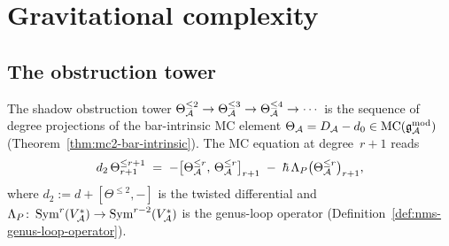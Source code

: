 %

\section{Gravitational complexity}
\label{sec:thqg-gravitational-complexity}


\subsection{The obstruction tower}
\label{subsec:thqg-obstruction-tower}

The shadow obstruction tower
$\Theta_{\mathcal{A}}^{\leq 2} \to \Theta_{\mathcal{A}}^{\leq 3} \to
\Theta_{\mathcal{A}}^{\leq 4} \to \cdots$
is the sequence of degree projections of the bar-intrinsic MC element
$\Theta_{\mathcal{A}} = D_{\mathcal{A}} - d_0 \in \mathrm{MC}(\mathfrak{g}_{\mathcal{A}}^{\mathrm{mod}})$
(Theorem~\ref{thm:mc2-bar-intrinsic}). The MC equation at
degree~$r{+}1$ reads
\begin{equation}\label{eq:thqg-obstruction-recursion}
d_2\,\Theta^{\leq r+1}_{r+1}
\;=\;
-\bigl[\Theta_{\mathcal{A}}^{\leq r},\, \Theta_{\mathcal{A}}^{\leq r}\bigr]_{r+1}
\;-\;
\hbar\,\Lambda_P\bigl(\Theta_{\mathcal{A}}^{\leq r}\bigr)_{r+1},
\end{equation}
where $d_2 := d + [\Theta^{\leq 2}, -]$ is the twisted differential
and $\Lambda_P\colon \operatorname{Sym}^r(V_{\mathcal{A}}^*) \to
\operatorname{Sym}^{r-2}(V_{\mathcal{A}}^*)$ is the genus-loop operator
(Definition~\ref{def:nms-genus-loop-operator}).

